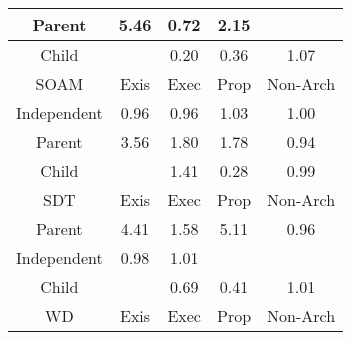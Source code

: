 \begin{tabular}{|c||c|c|c|c|}
\hline
Parent & \cellcolor[rgb]{0.6870144904578196,0.734375284953704,0.42} 5.46 & \cellcolor[rgb]{0.8572868264213913,0.5904909783945852,0.37080103799329844} 0.72 & \cellcolor[rgb]{0.8525451448733325,0.8127845423084207,0.42} 2.15 &  \\ 
\hline
Child &  & \cellcolor[rgb]{0.76,0.13,0.28} 0.20 & \cellcolor[rgb]{0.7902685921359109,0.2732713361099782,0.30825068599351685} 0.36 & \cellcolor[rgb]{0.9066324619076841,0.8384048503773239,0.42} 1.07 \\ 
\hline
\hline
SOAM & Exis & Exec & Prop & Non-Arch \\ 
\hline
Independent & \cellcolor[rgb]{0.9034330752151238,0.8089165560182523,0.41387087020078217} 0.96 & \cellcolor[rgb]{0.9032892705674866,0.8082358806861036,0.41373665252965425} 0.96 & \cellcolor[rgb]{0.9085275934666837,0.8393025442736922,0.42} 1.03 & \cellcolor[rgb]{0.909912546160853,0.8399585744972461,0.42} 1.00 \\ 
\hline
Parent & \cellcolor[rgb]{0.7819683664703009,0.7793534367490897,0.41999999999999993} 3.56 & \cellcolor[rgb]{0.870191802856306,0.8211434855635134,0.42} 1.80 & \cellcolor[rgb]{0.871232207639822,0.8216363088820209,0.42} 1.78 & \cellcolor[rgb]{0.8991178010445978,0.7884909249444295,0.4098432809749579} 0.94 \\ 
\hline
Child &  & \cellcolor[rgb]{0.8894419802860921,0.830261990661833,0.42} 1.41 & \cellcolor[rgb]{0.7762274921164322,0.20681012935111215,0.29514565930867004} 0.28 & \cellcolor[rgb]{0.907232042005059,0.8268983321572789,0.41741657253805503} 0.99 \\ 
\hline
\hline
SDT & Exis & Exec & Prop & Non-Arch \\ 
\hline
Parent & \cellcolor[rgb]{0.7395306093313926,0.7592513412622386,0.42} 4.41 & \cellcolor[rgb]{0.8811774200123204,0.8263471989532044,0.42} 1.58 & \cellcolor[rgb]{0.7044841820448957,0.7426504020212664,0.42} 5.11 & \cellcolor[rgb]{0.9031641338354142,0.8076435668209602,0.4136198582463865} 0.96 \\ 
\hline
Independent & \cellcolor[rgb]{0.9055840482296434,0.8190978282869787,0.41587844501433385} 0.98 & \cellcolor[rgb]{0.909498525542766,0.839762459467626,0.42} 1.01 &  &  \\ 
\hline
Child &  & \cellcolor[rgb]{0.851687028766575,0.5639852694951216,0.3655745601821367} 0.69 & \cellcolor[rgb]{0.7990260691407218,0.3147233939327495,0.31642433119800695} 0.41 & \cellcolor[rgb]{0.9094220368554272,0.8397262279841498,0.42} 1.01 \\ 
\hline
\hline
WD & Exis & Exec & Prop & Non-Arch \\ 

\end{tabular}
